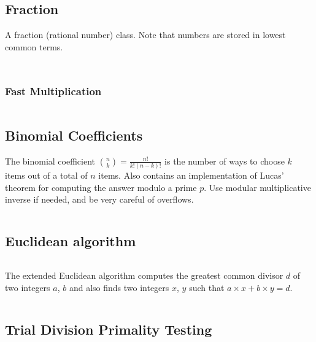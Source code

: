 \documentclass[8pt,a4paper,landscape,oneside]{amsart}
\newcommand{\code}[1]{\inputminted[fontsize=\normalsize,baselinestretch=1]{cpp}{_code/#1}}
\newif\ifverbose
\begin{document}
\begin{multicols*}{3}
    \subsection{Fraction}
        A fraction (rational number) class. Note that numbers are stored in
        lowest common terms.
        \code{mathematics/fraction.cpp}
    \fi

    \ifverbose
    \subsection{Big Integer}
        \ifverbose
        A big integer class.
        \fi
        \code{mathematics/intx.cpp}

        \subsubsection{Fast Multiplication}
            \ifverbose
            Fast multiplication for the big integer using Fast Fourier Transform.
            \fi
            \code{mathematics/fastmul.cpp}
    \fi

    \subsection{Binomial Coefficients}
        The binomial coefficient $\binom{n}{k} = \frac{n!}{k!(n-k)!}$ is the
        number of ways to choose $k$ items out of a total of $n$ items. Also
        contains an implementation of Lucas' theorem for computing the answer
        modulo a prime $p$. Use modular multiplicative inverse if needed, and
        be very careful of overflows.
        \code{mathematics/nck.cpp}

    \subsection{Euclidean algorithm}
        \ifverbose
        The Euclidean algorithm computes the greatest common divisor of two
        integers $a$, $b$.
        \fi
        \code{mathematics/gcd.cpp}

        The extended Euclidean algorithm computes the greatest common divisor
        $d$ of two integers $a$, $b$ and also finds two integers $x$, $y$ such
        that $a\times x + b\times y = d$.
        \code{mathematics/egcd.cpp}

    \subsection{Trial Division Primality Testing}
        \ifverbose
        An optimized trial division to check whether an integer is prime.
        \fi
        \code{mathematics/is_prime.cpp}


\end{multicols*}
\end{document}

